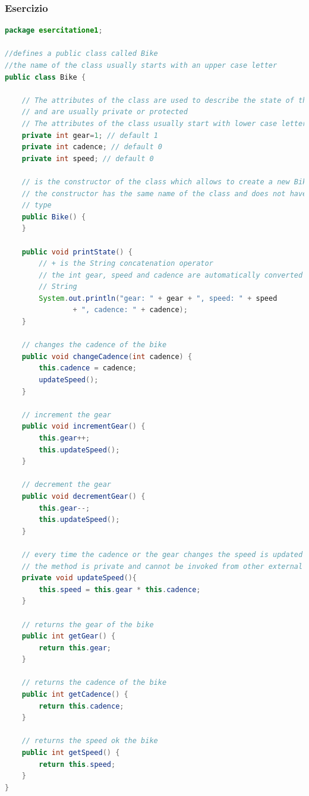 \documentclass{article}
\theoremstyle{definition}
\begin{document}
\subsubsection{Esercizio}

\begin{lstlisting}[language=Java,escapechar=|]
package esercitatione1;

//defines a public class called Bike 
//the name of the class usually starts with an upper case letter
public class Bike {

	// The attributes of the class are used to describe the state of the class
	// and are usually private or protected
	// The attributes of the class usually start with lower case letters
	private int gear=1; // default 1
	private int cadence; // default 0
	private int speed; // default 0

	// is the constructor of the class which allows to create a new Bike
	// the constructor has the same name of the class and does not have a return
	// type
	public Bike() {
	}

	public void printState() {
		// + is the String concatenation operator
		// the int gear, speed and cadence are automatically converted into
		// String
		System.out.println("gear: " + gear + ", speed: " + speed
				+ ", cadence: " + cadence);
	}
    
    // changes the cadence of the bike
	public void changeCadence(int cadence) {
		this.cadence = cadence;
		updateSpeed();
	}

	// increment the gear
	public void incrementGear() {
		this.gear++;
		this.updateSpeed();
	}

	// decrement the gear
	public void decrementGear() {
		this.gear--;
		this.updateSpeed();
	}

	// every time the cadence or the gear changes the speed is updated
	// the method is private and cannot be invoked from other external classes
	private void updateSpeed(){
		this.speed = this.gear * this.cadence; 
	}
	
	// returns the gear of the bike
	public int getGear() {
		return this.gear;
	}

	// returns the cadence of the bike
	public int getCadence() {
		return this.cadence;
	}

	// returns the speed ok the bike
	public int getSpeed() {
		return this.speed;
	}
}
\end{lstlisting}
\end{document}
